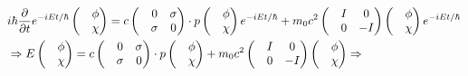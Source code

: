 \begin{equation*}
  \begin{split}
    &i\hbar \frac{\partial }{\partial t}e^{-iEt/\hbar}
    \begin{pmatrix}
      &\phi\\
      &\chi
    \end{pmatrix}
    = c
    \begin{pmatrix}
      &0 &\sigma\\
      &\sigma &0 
    \end{pmatrix} 
    \cdot p
    \begin{pmatrix}
      &\phi\\
      &\chi
    \end{pmatrix}  
    e^{-iEt/\hbar}+ m_0c^2 
    \begin{pmatrix}
      &I &0\\
      &0 &-I 
    \end{pmatrix}
    \begin{pmatrix}
      &\phi\\
      &\chi
    \end{pmatrix} 
    e^{-iEt/\hbar} \\
    &\Rightarrow E 
    \begin{pmatrix}
      &\phi\\
      &\chi
    \end{pmatrix}
    = c
    \begin{pmatrix}
      &0 &\sigma\\
      &\sigma &0 
    \end{pmatrix} 
    \cdot p
    \begin{pmatrix}
      &\phi\\
      &\chi
    \end{pmatrix}  
    + m_0c^2 
    \begin{pmatrix}
      &I &0\\
      &0  &-I 
    \end{pmatrix}
    \begin{pmatrix}
      &\phi\\
      &\chi
    \end{pmatrix}
    \Rightarrow 
 \end{split}
\end{equation*}
 
